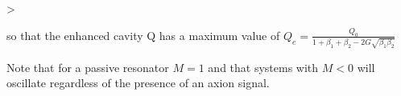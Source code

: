 >\documentclass[aps,prl,twocolumn,groupedaddress]{revtex4-1}
\begin{document}

so that the enhanced cavity Q has a maximum value of 
$Q_e = \frac{Q_0}{1 + \beta_1 + \beta_2 - 2G\sqrt{\beta_1 \beta_2}}$

Note that for a passive resonator $M=1$ and that systems with $M<0$ will oscillate regardless of the presence of an axion signal. 
\end{document}

